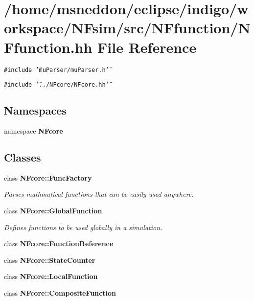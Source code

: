 \section{/home/msneddon/eclipse/indigo/workspace/NFsim/src/NFfunction/NFfunction.hh File Reference}
\label{NFfunction_8hh}


{\tt \#include \char`\"{}muParser/muParser.h\char`\"{}}\par
{\tt \#include \char`\"{}../NFcore/NFcore.hh\char`\"{}}\par
\subsection*{Namespaces}
\begin{CompactItemize}
\item 
namespace {\bf NFcore}
\end{CompactItemize}
\subsection*{Classes}
\begin{CompactItemize}
\item 
class {\bf NFcore::FuncFactory}
\begin{CompactList}\small\item\em Parses mathmatical functions that can be easily used anywhere. \item\end{CompactList}\item 
class {\bf NFcore::GlobalFunction}
\begin{CompactList}\small\item\em Defines functions to be used globally in a simulation. \item\end{CompactList}\item 
class {\bf NFcore::FunctionReference}
\item 
class {\bf NFcore::StateCounter}
\item 
class {\bf NFcore::LocalFunction}
\item 
class {\bf NFcore::CompositeFunction}
\end{CompactItemize}
